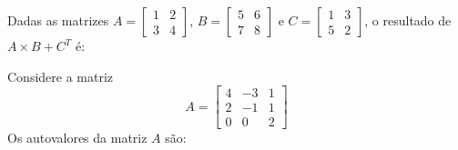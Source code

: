 \documentclass[10pt,a4paper]{article}
\begin{document}
{
\def\AMCbeginQuestion#1#2{\par\noindent{\bf (POSCOMP 2009 - Questão 02)}}
\begin{question}{} Dadas as matrizes $A=\left[\begin{array}{rr}1&2\\3&4\end{array}\right]$, $B=\left[\begin{array}{rr}5&6\\7&8\end{array}\right]$ e $C=\left[\begin{array}{rr}1&3\\5&2\end{array}\right]$, o resultado de $A\times B+C^{T}$ é:
\begin{choices}
\correctchoice{$\left[\begin{array}{rr}20&27\\46&52\end{array}\right]$}
\wrongchoice{$\left[\begin{array}{rr}20&25\\48&52\end{array}\right]$}
\wrongchoice{$\left[\begin{array}{rr}19&22\\43&50\end{array}\right]$}
\wrongchoice{$\left[\begin{array}{rr}24&39\\34&48\end{array}\right]$}
\end{choices}
\end{question}
}
%
{
\def\AMCbeginQuestion#1#2{\par\noindent{\bf (POSCOMP 2010 - Questão 01)}}
\begin{question}{} Considere a matriz
\[
A=\left[\begin{array}{rrr}4&-3&1\\2&-1&1\\0&0&2\end{array}\right]
\]
Os autovalores da matriz $A$ são:
\begin{choices}
\end{choices}
\end{question}
}
%
\end{document}
